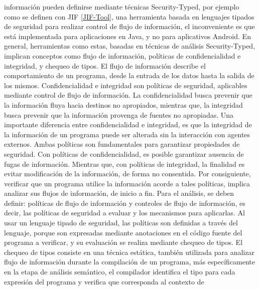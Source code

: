 información pueden definirse mediante técnicas Security-Typed, por ejemplo como se definen con JIF \ref{JIF-Tool}, una herramienta basada en lenguajes tipados de seguridad
para realizar control de flujo de información, el inconveniente es que está
implementada para aplicaciones en Java, y no para aplicativos Android.\newline 
En general, herramientas como estas, basadas en técnicas de análisis
Security-Typed, implican conceptos como flujo de información, políticas de
confidencialidad e integridad, y chequeo de tipos.\newline 
El flujo de información describe el comportamiento de un programa, desde la
entrada de los datos hasta la salida de los mismos.\newline 
Confidencialidad e integridad son políticas de seguridad, aplicables mediante
control de flujo de información. La confidencialidad busca prevenir que la
información fluya hacia destinos no apropiados, mientras que, la integridad
busca prevenir que la información provenga de fuentes no apropiadas. Una
importante diferencia entre confidencialidad e integridad, es que la integridad
de la información de un programa puede ser alterada sin la interacción con
agentes externos.\newline %
Ambas políticas son fundamentales para garantizar propiedades de seguridad. Con
políticas de confidencialidad, es posible garantizar ausencia de fugas de
información. Mientras que, con políticas de integridad, la finalidad es evitar
modificación de la información, de forma no consentida.\newline
Por consiguiente, verificar que un programa utilice la información acorde a
tales políticas, implica analizar sus flujos de información, de inicio a fin.
Para el análisis, se deben definir: políticas de flujo de información y
controles de flujo de información, es decir, las políticas de seguridad a
evaluar y los mecanismos para aplicarlas.\newline 
Al usar un lenguaje tipado de seguridad, las políticas son definidas a través
del lenguaje, porque son expresadas mediante anotaciones en el código fuente del
programa a verificar, y su evaluación se realiza mediante chequeo de tipos. El
chequeo de tipos consiste en una técnica estática, también utilizada para
analizar flujo de información durante la compilación de un programa, más
específicamente en la etapa de análisis semántico, el compilador identifica el
tipo para cada expresión del programa y verifica que corresponda al contexto de
